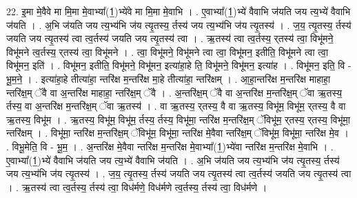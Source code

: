 \documentclass[17pt]{extarticle}
\begin{document}
22. इ॒मा मे॒वैवे मा मि॒मा मे॒वाभ्या᳚(1॒)भ्ये॑वे मा मि॒मा मे॒वाभि । . ए॒वाभ्या᳚(1॒)भ्ये॑ वैवाभि ज॑यति जय त्य॒भ्ये॑ वैवाभि ज॑यति । . अ॒भि ज॑यति जय त्य॒भ्य॑भि ज॑य त्यृ॒तस्य॒ र्तस्य॑ जय त्य॒भ्य॑भि ज॑य त्यृ॒तस्य॑ । . ज॒य॒ त्यृ॒तस्य॒ र्तस्य॑ जयति जय त्यृ॒तस्य॑ त्वा त्व॒र्तस्य॑ जयति जय त्यृ॒तस्य॑ त्वा । . ऋ॒तस्य॑ त्वा त्व॒र्तस्य॒ र्‌तस्य॑ त्वा॒ विभू॑मने॒ विभू॑मने त्व॒र्तस्य॒ र्‌तस्य॑ त्वा॒ विभू॑मने । . त्वा॒ विभू॑मने॒ विभू॑मने त्वा त्वा॒ विभू॑मन॒ इतीति॒ विभू॑मने त्वा त्वा॒ विभू॑मन॒ इति॑ । . विभू॑मन॒ इतीति॒ विभू॑मने॒ विभू॑मन॒ इत्या॑हा॒हे ति॒ विभू॑मने॒ विभू॑मन॒ इत्या॑ह । . विभू॑मन॒ इति॒ वि - भू॒म॒ने॒ । . इत्या॑हा॒हे तीत्या॑हा॒ न्तरि॑क्ष म॒न्तरि॑क्ष मा॒हे तीत्या॑हा॒ न्तरि॑क्षम् । . आ॒हा॒न्तरि॑क्ष म॒न्तरि॑क्ष माहाहा॒ न्तरि॑क्ष॒म् ॅवै वा अ॒न्तरि॑क्ष माहाहा॒ न्तरि॑क्ष॒म् ॅवै । . अ॒न्तरि॑क्ष॒म् ॅवै वा अ॒न्तरि॑क्ष म॒न्तरि॑क्ष॒म् ॅवा ऋ॒तस्य॒ र्तस्य॒ वा अ॒न्तरि॑क्ष म॒न्तरि॑क्ष॒म् ॅवा ऋ॒तस्य॑ । . वा ऋ॒तस्य॒ र्‌तस्य॒ वै वा ऋ॒तस्य॒ विभू॑म॒ विभू॑म॒ र्‌तस्य॒ वै वा ऋ॒तस्य॒ विभू॑म । . ऋ॒तस्य॒ विभू॑म॒ विभू॑म॒ र्तस्य॒ र्तस्य॒ विभू॑मा॒ न्तरि॑क्ष म॒न्तरि॑क्ष॒म् ॅविभू॑म॒ र्‌तस्य॒ र्‌तस्य॒ विभू॑मा॒ न्तरि॑क्षम् । . विभू॑मा॒ न्तरि॑क्ष म॒न्तरि॑क्ष॒म् ॅविभू॑म॒ विभू॑मा॒ न्तरि॑क्ष मे॒वैवा न्तरि॑क्ष॒म् ॅविभू॑म॒ विभू॑मा॒ न्तरि॑क्ष मे॒व । . विभू॒मेति॒ वि - भू॒म॒ । . अ॒न्तरि॑क्ष मे॒वैवा न्तरि॑क्ष म॒न्तरि॑क्ष मे॒वाभ्या᳚(1॒)भ्ये॑वा न्तरि॑क्ष म॒न्तरि॑क्ष मे॒वाभि । . ए॒वाभ्या᳚(1॒)भ्ये॑ वैवाभि ज॑यति जय त्य॒भ्ये॑ वैवाभि ज॑यति । . अ॒भि ज॑यति जय त्य॒भ्य॑भि ज॑य त्यृ॒तस्य॒ र्तस्य॑ जय त्य॒भ्य॑भि ज॑य त्यृ॒तस्य॑ । . ज॒य॒ त्यृ॒तस्य॒ र्तस्य॑ जयति जय त्यृ॒तस्य॑ त्वा त्व॒र्तस्य॑ जयति जय त्यृ॒तस्य॑ त्वा । . ऋ॒तस्य॑ त्वा त्व॒र्तस्य॒ र्तस्य॑ त्वा॒ विध॑र्मणे॒ विध॑र्मणे त्व॒र्तस्य॒ र्तस्य॑ त्वा॒ विध॑र्मणे । \newline
\end{document}
